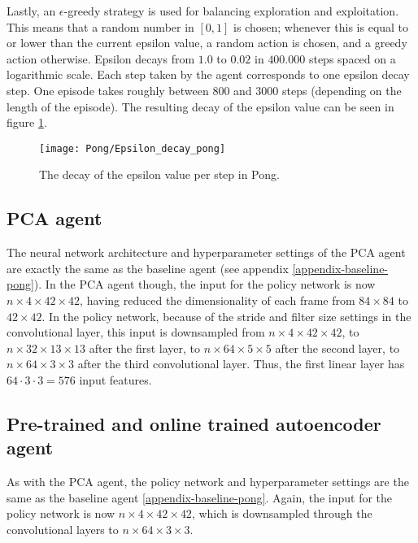 Lastly, an $\epsilon$-greedy strategy is used for balancing exploration and exploitation. This means that a random number in $[0,1]$ is chosen; whenever this is equal to or lower than the current epsilon value, a random action is chosen, and a greedy action otherwise. Epsilon decays from $1.0$ to $0.02$ in $400.000$ steps spaced on a logarithmic scale. Each step taken by the agent corresponds to one epsilon decay step. One episode takes roughly between $800$ and $3000$ steps (depending on the length of the episode). The resulting decay of the epsilon value can be seen in figure \ref{fig:epsilon-pong}.

\begin{figure}[h]
    \centering
    \texttt{[image: Pong/Epsilon\_decay\_pong]}
    \caption{The decay of the epsilon value per step in Pong.}
    \label{fig:epsilon-pong}
\end{figure}

\subsection{PCA agent}
The neural network architecture and hyperparameter settings of the PCA agent are exactly the same as the baseline agent (see appendix \ref{appendix-baseline-pong}). In the PCA agent though, the input for the policy network is now $n \times 4 \times 42 \times 42$, having reduced the dimensionality of each frame from $84 \times 84$ to $42 \times 42$. In the policy network, because of the stride and filter size settings in the convolutional layer, this input is downsampled from $n \times 4 \times 42 \times 42$, to $n \times 32 \times 13 \times 13$ after the first layer, to $n \times 64 \times 5 \times 5$ after the second layer, to $n \times 64 \times 3 \times 3$ after the third convolutional layer. Thus, the first linear layer has $64 \cdot 3 \cdot 3 = 576$ input features.


\subsection{Pre-trained and online trained autoencoder agent} %
As with the PCA agent, the policy network and hyperparameter settings are the same as the baseline agent \ref{appendix-baseline-pong}. Again, the input for the policy network is now $n \times 4 \times 42 \times 42$, which is downsampled through the convolutional layers to $n \times 64 \times 3 \times 3$. \newline\par


